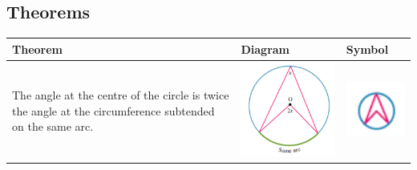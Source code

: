 \documentclass[a4paper,10pt]{report}
\begin{document}
\subsection{Theorems}
\begin{tabular}[center]{p{5cm}|p{6cm}|p{3cm}}
	Theorem                                                                                                  & Diagram                                       & Symbol                                               \\ \hline
	The angle at the centre of the circle is twice the angle at the circumference subtended on the same arc. & \includegraphics[width=6cm]{circle theorem 1} & \includegraphics[width=3cm]{circle theorem 1 symbol}
\end{tabular}
\end{document}
